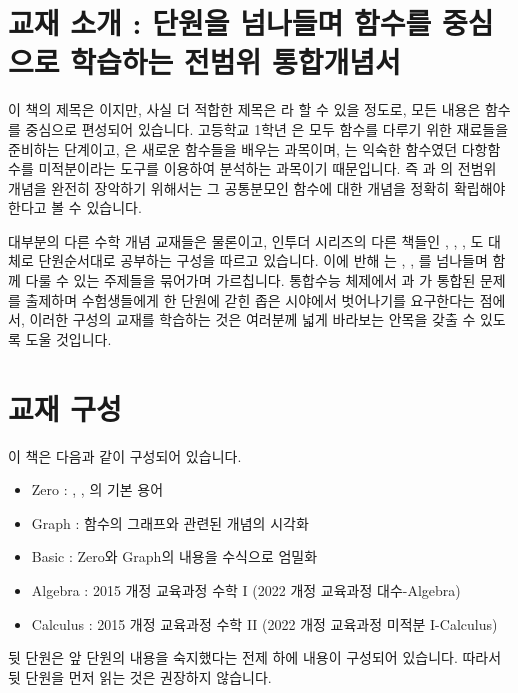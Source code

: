 
\section{교재 소개 : 단원을 넘나들며 함수를 중심으로 학습하는 전범위 통합개념서}
이 책의 제목은 이지만, 사실 더 적합한 제목은 라 할 수 있을 정도로, 모든 내용은 함수를 중심으로 편성되어 있습니다. 고등학교 1학년 은 모두 함수를 다루기 위한 재료들을 준비하는 단계이고, 은 새로운 함수들을 배우는 과목이며, 는 익숙한 함수였던 다항함수를 미적분이라는 도구를 이용하여 분석하는 과목이기 때문입니다. 즉 과 의 전범위 개념을 완전히 장악하기 위해서는 그 공통분모인 함수에 대한 개념을 정확히 확립해야 한다고 볼 수 있습니다.

대부분의 다른 수학 개념 교재들은 물론이고, 인투더 시리즈의 다른 책들인 , , , 도 대체로 단원순서대로 공부하는 구성을 따르고 있습니다. 이에 반해 는 , , 를 넘나들며 함께 다룰 수 있는 주제들을 묶어가며 가르칩니다. 통합수능 체제에서 과 가 통합된 문제를 출제하며 수험생들에게 한 단원에 갇힌 좁은 시야에서 벗어나기를 요구한다는 점에서, 이러한 구성의 교재를 학습하는 것은 여러분께 넓게 바라보는 안목을 갖출 수 있도록 도울 것입니다.
\section{교재 구성}
이 책은 다음과 같이 구성되어 있습니다. 
\begin{itemize}
    \item Zero : , , 의 기본 용어
    \item Graph : 함수의 그래프와 관련된 개념의 시각화
    \item Basic : Zero와 Graph의 내용을 수식으로 엄밀화
    \item Algebra : 2015 개정 교육과정 수학 I (2022 개정 교육과정 대수-Algebra)
    \item Calculus : 2015 개정 교육과정 수학 II (2022 개정 교육과정 미적분 I-Calculus)
\end{itemize}
뒷 단원은 앞 단원의 내용을 숙지했다는 전제 하에 내용이 구성되어 있습니다. 따라서 뒷 단원을 먼저 읽는 것은 권장하지 않습니다. 



